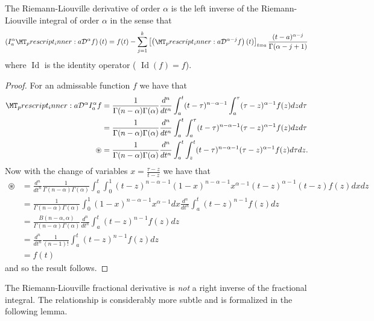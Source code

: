 \begin{lemma}
    \label{lem:rld_left_inverse}
    The Riemann-Liouville derivative of order $ \alpha $ is the left inverse of the Riemann-Liouville integral of order $ \alpha $ in the sense
    that
    \begin{align}
        \left(I_a^\alpha \prescript{}{a}{\mathcal{D}}^\alpha f\right)(t) = f(t) - \sum_{j=1}^{k}\left[ \left(\prescript{}{a}{\mathcal{D}}^{\alpha - j}f \right)(t) \right]_{t=a} \frac{(t-a)^{\alpha - j}}{\Gamma(\alpha - j + 1)}
    \end{align}
    where $ \operatorname{Id} $ is the identity operator ( $\operatorname{Id}(f) = f $).
\end{lemma}
\begin{proof}
For an admissable function $ f $ we have that
\begin{align}
    \prescript{}{a}{\mathcal{D}}^\alpha I_{a}^\alpha f &= \frac{1}{\Gamma(n-\alpha)\Gamma(\alpha)} \frac{d^n}{dt^n} \int_a^t (t-\tau)^{n-\alpha-1}\int_a^\tau (\tau - z)^{\alpha-1} f(z) dz d\tau \\
    &= \frac{1}{\Gamma(n-\alpha)\Gamma(\alpha)} \frac{d^n}{dt^n} \int_a^t \int_a^\tau (t-\tau)^{n-\alpha-1}(\tau - z)^{\alpha - 1}f(z)dzd\tau \\
    \circledast &= \frac{1}{\Gamma(n-\alpha)\Gamma(\alpha)} \frac{d^n}{dt^n} \int_a^t \int_z^t (t-\tau)^{n-\alpha-1}(\tau - z)^{\alpha - 1} f(z)d\tau dz.
\end{align}
Now with the change of variables $ x = \frac{\tau - z}{t - z} $ we have that
\begin{align}
    \circledast &= \frac{d^n}{dt^n}\frac{1}{\Gamma(n-\alpha)\Gamma(\alpha)}\int_a^t \int_0^1 (t-z)^{n-\alpha-1}(1-x)^{n-\alpha-1} x^{\alpha-1}(t-z)^{\alpha-1}(t-z)f(z)dxdz \\
    &= \frac{1}{\Gamma(n-\alpha)\Gamma(\alpha)} \int_0^1 (1-x)^{n-\alpha-1}x^{\alpha-1} dx \frac{d^n}{dt^n}\int_a^t (t-z)^{n-1}f(z)dz \\
    &= \frac{B(n-\alpha, \alpha)}{\Gamma(n-\alpha)\Gamma(\alpha)} \frac{d^n}{dt^n} \int_a^t (t-z)^{n-1}f(z)dz \\
    &= \frac{d^n}{dt^n} \frac{1}{(n-1)!} \int_{a}^t(t-z)^{n-1}f(z) dz \\
    &= f(t)
\end{align}
and so the result follows.
\end{proof}
The Riemann-Liouville fractional derivative is \emph{not} a right inverse of the fractional integral. The relationship is considerably more subtle
and is formalized in the following lemma.
